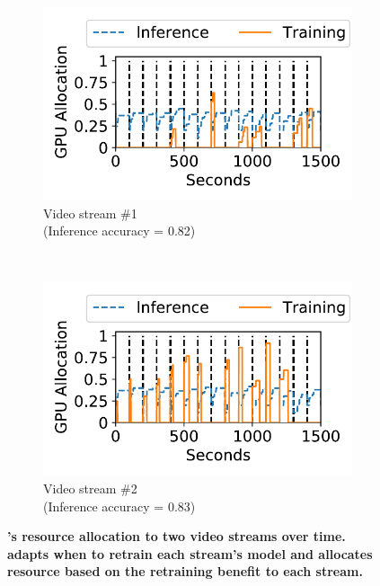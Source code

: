 \begin{figure}
\captionsetup[subfigure]{justification=centering}
  \centering
  \begin{subfigure}[t]{0.45\linewidth}
    \centering
    \includegraphics[width=\linewidth]{ekya/results/multicam/long_video_gpu_allocation_vs_time_cam1.pdf}
    \caption{\small Video stream \#1 \\(Inference accuracy = 0.82)}
    \label{fig:temporal-video-1}
  \end{subfigure}
  ~
  \begin{subfigure}[t]{0.45\linewidth}
    \centering
    \includegraphics[width=\linewidth]{ekya/results/multicam/long_video_gpu_allocation_vs_time_cam5.pdf} 
    \caption{\small Video stream \#2 \\(Inference accuracy = 0.83)}
    \label{fig:temporal-video-2}
  \end{subfigure}
  \caption{\small \bf \name's resource allocation to two video streams over time. \name adapts when to retrain each stream's model and allocates resource based on the retraining benefit to each stream.}
  \label{fig:temporal-resource-allocation}
\end{figure}

